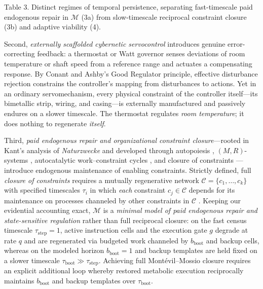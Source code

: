 \documentclass[11pt,a4paper]{article}
\begin{document}
Table 3. Distinct regimes of temporal persistence, separating
fast-timescale paid endogenous repair in \(\mathcal{M}\) (3a) from
slow-timescale reciprocal constraint closure (3b) and adaptive viability
(4).

Second, \emph{externally scaffolded cybernetic servocontrol}
\citep{rosenblueth1943, conantAshby1970} introduces genuine
error-correcting feedback: a thermostat or Watt governor senses
deviations of room temperature or shaft speed from a reference range and
actuates a compensating response. By Conant and Ashby's
\citeyearpar{conantAshby1970} Good Regulator principle, effective
disturbance rejection constrains the controller's mapping from
disturbances to actions. Yet in an ordinary servomechanism, every
physical constraint of the controller itself---its bimetallic strip,
wiring, and casing---is externally manufactured and passively endures on
a slower timescale. The thermostat regulates \emph{room temperature}; it
does nothing to regenerate \emph{itself}.

Third, \emph{paid endogenous repair and organizational constraint
closure}---rooted in Kant's \citeyearpar[§§64--65]{kant1790} analysis of
\emph{Naturzwecke} and developed through autopoiesis
\citep{varela1974, maturanaVarela1980, weberVarela2002},
\((M,R)\)-systems \citep{rosen1991}, autocatalytic work--constraint
cycles \citep{kauffman1993, deacon2011}, and closure of constraints
\citep{mossio2009, montevilMossio2015}---introduce endogenous
maintenance of enabling constraints. Strictly defined, full
\emph{closure of constraints} \citep{montevilMossio2015} requires a
mutually regenerative network \(\mathcal{C} = \{c_1, \dots, c_k\}\) with
specified timescales \(\tau_i\) in which \emph{each} constraint
\(c_j \in \mathcal{C}\) depends for its maintenance on processes
channeled by other constraints in \(\mathcal{C}\)
\citep{jonas1966, thompson2007}. Keeping our evidential accounting
exact, \(\mathcal{M}\) is a \emph{minimal model of paid endogenous
repair and state-sensitive regulation} rather than full reciprocal
closure: on the fast census timescale \(\tau_{\mathrm{step}} = 1\),
active instruction cells and the execution gate \(g\) degrade at rate
\(q\) and are regenerated via budgeted work channeled by
\(b_{\mathrm{boot}}\) and backup cells, whereas on the modeled horizon
\(b_{\mathrm{boot}} = 1\) and backup templates are held fixed on a
slower timescale \(\tau_{\mathrm{boot}} \gg \tau_{\mathrm{step}}\).
Achieving full Montévil--Mossio closure requires an explicit additional
loop whereby restored metabolic execution reciprocally maintains
\(b_{\mathrm{boot}}\) and backup templates over
\(\tau_{\mathrm{boot}}\).
\end{document}
